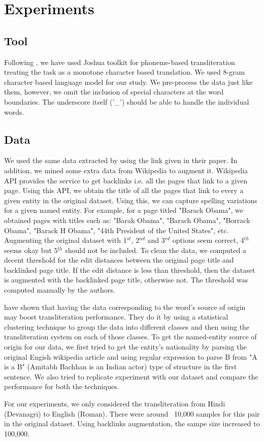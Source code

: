 \documentclass[11pt,a4paper]{article}
\begin{document}
\section{Experiments}

\subsection{Tool}
Following \citet{burch-1}, we have used Joshua toolkit for phoneme-based transliteration treating the task as a monotone character based translation. We used 8-gram character based language model for our study. We pre-process the data just like them, however, we omit the inclusion of special characters at the word boundaries. The underscore itself ('\_') should be able to handle the individual words.

\subsection{Data}
We used the same data extracted by \citet{burch-1} using the link given in their paper. In addition, we mined some extra data from Wikipedia to augment it. Wikipedia API provides the service to get backlinks i.e. all the pages that link to a given page. Using this API, we obtain the title of all the pages that link to every a given entity in the original dataset. Using this, we can capture spelling variations for a given named entity. For example, for a page titled "Barack Obama", we obtained pages with titles such as: "Barak Obama", "Barach Obama", "Borrack Obama", "Barack H Obama", "44th President of the United States", etc. Augmenting the original dataset with 1$^{st}$, 2$^{nd}$ and 3$^{rd}$ options seem correct, 4$^{th}$ seems okay but 5$^{th}$ should not be included. To clean the data, we computed a decent threshold for the edit distances between the original page title and backlinked page title. If the edit distance is less than threshold, then the dataset is augmented with the backlinked page title, otherwise not. The threshold was computed manually by the authors.
\par
\citet{huang-name-origin-1} have shown that having the data corresponding to the word's source of origin may boost transliteration performance. They do it by using a statistical clustering technique to group the data into different classes and then using the transliteration system on each of those classes. To get the named-entity source of origin for our data, we first tried to get the entity's nationality by parsing the original Engish wikipedia article and using regular expression to parse B from "A is a B" (Amitabh Bachhan is an Indian actor) type of structure in the first sentence. We also tried to replicate \citet{huang-name-origin-1} experiment with our dataset and compare the performance for both the techniques. 
\par
For our experiments, we only considered the transliteration from Hindi (Devanagri) to English (Roman). There were around ~10,000 samples for this pair in the original dataset. Using backlinks augmentation, the sampe size increased to 100,000.
\end{document}
